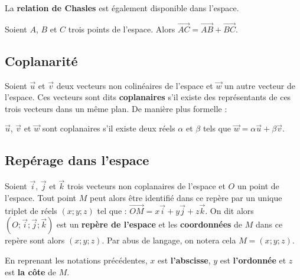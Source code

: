 	La \textbf{relation de Chasles} est également disponible dans l'espace.
	
	\begin{formula}
		Soient $A$, $B$ et $C$ trois points de l'espace. Alors $\overrightarrow{AC} = \overrightarrow{AB} + \overrightarrow{BC}$.
	\end{formula}
	
	\subsection{Coplanarité}
	
	Soient $\overrightarrow{u}$ et $\overrightarrow{v}$ deux vecteurs non colinéaires de l'espace et $\overrightarrow{w}$ un autre vecteur de l'espace. Ces vecteurs sont dits \textbf{coplanaires} s'il existe des représentants de ces trois vecteurs dans un même plan. De manière plus formelle :
	
	\begin{formula}[Définition]
		$\overrightarrow{u}$, $\overrightarrow{v}$ et $\overrightarrow{w}$ sont coplanaires s'il existe deux réels $\alpha$ et $\beta$ tels que $\overrightarrow{w} = \alpha \overrightarrow{u} + \beta \overrightarrow{v}$.
	\end{formula}
	
	\subsection{Repérage dans l'espace}
	
	\begin{formula}
		Soient $\overrightarrow{i}$, $\overrightarrow{j}$ et $\overrightarrow{k}$ trois vecteurs non coplanaires de l'espace et $O$ un point de l'espace.
		Tout point $M$ peut alors être identifié dans ce repère par un unique triplet de réels $(x;y;z)$ tel que :
		\newpar
		$\overrightarrow{OM} = x\overrightarrow{i} + y\overrightarrow{j} + z\overrightarrow{k}$.
		\newpar
		On dit alors $(O ; \overrightarrow{i} ; \overrightarrow{j} ; \overrightarrow{k})$ est un \textbf{repère de l'espace} et les \textbf{coordonnées} de $M$ dans ce repère sont alors $(x; y; z)$. Par abus de langage, on notera cela $M = (x; y; z)$.
	\end{formula}
	
	\begin{tip}
		En reprenant les notations précédentes, $x$ est \textbf{l'abscisse}, $y$ est \textbf{l'ordonnée} et $z$ est \textbf{la côte} de $M$.
	\end{tip}
	
